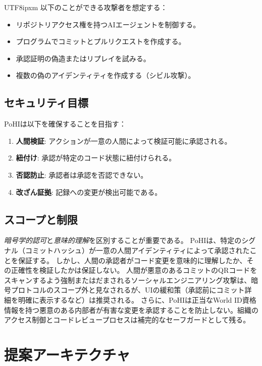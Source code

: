 \documentclass[a4paper,10pt]{article}
\begin{document}
\begin{CJK}{UTF8}{ipxm}
以下のことができる攻撃者を想定する：
\begin{itemize}
    \item リポジトリアクセス権を持つAIエージェントを制御する。
    \item プログラムでコミットとプルリクエストを作成する。
    \item 承認証明の偽造またはリプレイを試みる。
    \item 複数の偽のアイデンティティを作成する（シビル攻撃）。
\end{itemize}

\subsection{セキュリティ目標}

PoHIは以下を確保することを目指す：
\begin{enumerate}
    \item \textbf{人間検証}: アクションが一意の人間によって検証可能に承認される。
    \item \textbf{紐付け}: 承認が特定のコード状態に紐付けられる。
    \item \textbf{否認防止}: 承認者は承認を否認できない。
    \item \textbf{改ざん証拠}: 記録への変更が検出可能である。
\end{enumerate}

\subsection{スコープと制限}

\textit{暗号学的認可}と\textit{意味的理解}を区別することが重要である。
PoHIは、特定のシグナル（コミットハッシュ）が一意の人間アイデンティティによって承認されたことを保証する。
しかし、人間の承認者がコード変更を意味的に理解したか、その正確性を検証したかは保証しない。
人間が悪意のあるコミットのQRコードをスキャンするよう強制またはだまされるソーシャルエンジニアリング攻撃は、暗号プロトコルのスコープ外と見なされるが、UIの緩和策（承認前にコミット詳細を明確に表示するなど）は推奨される。
さらに、PoHIは正当なWorld ID資格情報を持つ悪意のある内部者が有害な変更を承認することを防止しない。組織のアクセス制御とコードレビュープロセスは補完的なセーフガードとして残る。

\section{提案アーキテクチャ}


\end{CJK}
\end{document}
